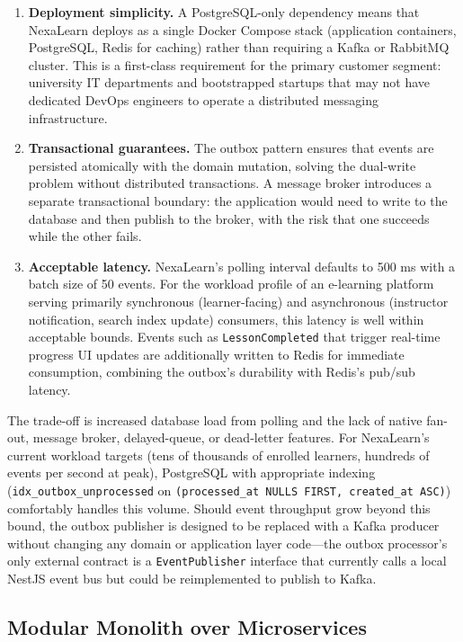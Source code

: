 \begin{enumerate}
  \item \textbf{Deployment simplicity.} A PostgreSQL-only dependency means that NexaLearn deploys as a single Docker Compose stack (application containers, PostgreSQL, Redis for caching) rather than requiring a Kafka or RabbitMQ cluster. This is a first-class requirement for the primary customer segment: university IT departments and bootstrapped startups that may not have dedicated DevOps engineers to operate a distributed messaging infrastructure.
  \item \textbf{Transactional guarantees.} The outbox pattern ensures that events are persisted atomically with the domain mutation, solving the dual-write problem without distributed transactions. A message broker introduces a separate transactional boundary: the application would need to write to the database and then publish to the broker, with the risk that one succeeds while the other fails.
  \item \textbf{Acceptable latency.} NexaLearn's polling interval defaults to 500 ms with a batch size of 50 events. For the workload profile of an e-learning platform serving primarily synchronous (learner-facing) and asynchronous (instructor notification, search index update) consumers, this latency is well within acceptable bounds. Events such as \texttt{LessonCompleted} that trigger real-time progress UI updates are additionally written to Redis for immediate consumption, combining the outbox's durability with Redis's pub/sub latency.
\end{enumerate}

The trade-off is increased database load from polling and the lack of native fan-out, message broker, delayed-queue, or dead-letter features. For NexaLearn's current workload targets (tens of thousands of enrolled learners, hundreds of events per second at peak), PostgreSQL with appropriate indexing (\texttt{idx\_outbox\_unprocessed} on \texttt{(processed\_at NULLS FIRST, created\_at ASC)}) comfortably handles this volume. Should event throughput grow beyond this bound, the outbox publisher is designed to be replaced with a Kafka producer without changing any domain or application layer code---the outbox processor's only external contract is a \texttt{EventPublisher} interface that currently calls a local NestJS event bus but could be reimplemented to publish to Kafka.

\subsection{Modular Monolith over Microservices}

